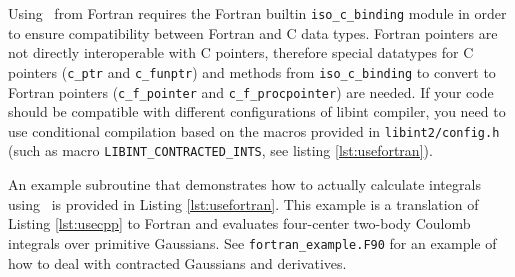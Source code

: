 \documentclass[10pt]{article}
\begin{document}
Using \LIBINT\ from Fortran requires the Fortran builtin {\tt iso\_c\_binding} module in order to ensure compatibility between Fortran and C data types.
Fortran pointers are not directly interoperable with C pointers, therefore special datatypes for C pointers ({\tt c\_ptr} and {\tt c\_funptr}) and methods
from {\tt iso\_c\_binding} to convert to Fortran pointers ({\tt c\_f\_pointer} and {\tt c\_f\_procpointer}) are needed.
If your code should be compatible with different configurations of libint compiler, you need to use conditional compilation based on the macros provided
in {\tt libint2/config.h} (such as macro {\tt LIBINT\_CONTRACTED\_INTS}, see listing \ref{lst:usefortran}).

An example subroutine that demonstrates how to actually calculate integrals using \LIBINT\ is provided in Listing \ref{lst:usefortran}.
This example is a translation of Listing \ref{lst:usecpp} to Fortran and evaluates four-center two-body Coulomb integrals over primitive Gaussians.
See {\tt fortran\_example.F90} for an example of how to deal with contracted Gaussians and derivatives.
\end{document}
